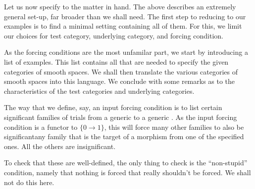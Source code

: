 \documentclass[%
12pt,%
arxiv,%
defaults
]{myclass}
\begin{document}
Let us now specify to the matter in hand.
The above describes an extremely general set\hyp{}up, far broader than we shall need.
The first step to reducing to our examples is to find a minimal setting containing all of them.
For this, we limit our choices for test category, underlying category, and forcing condition.

As the forcing conditions are the most unfamilar part, we start by introducing a list of examples.
This list contains all that are needed to specify the given categories of smooth spaces.
We shall then translate the various categories of smooth spaces into this language.
We conclude with some remarks as to the characteristics of the test categories and underlying categories.

The way that we define, say, an input forcing condition is to list certain significant families of trials from a generic \tobj to a generic \uVtobj.
As the input forcing condition is a functor to \(\{0 \to 1\}\), this will force many other families to also be significant\emhyp{}any family that is the target of a morphism from one of the specified ones.
All the others are insignificant.

To check that these are well\hyp{}defined, the only thing to check is the ``non\hyp{}stupid'' condition, namely that nothing is forced that really shouldn't be forced.
We shall not do this here.
\end{document}
